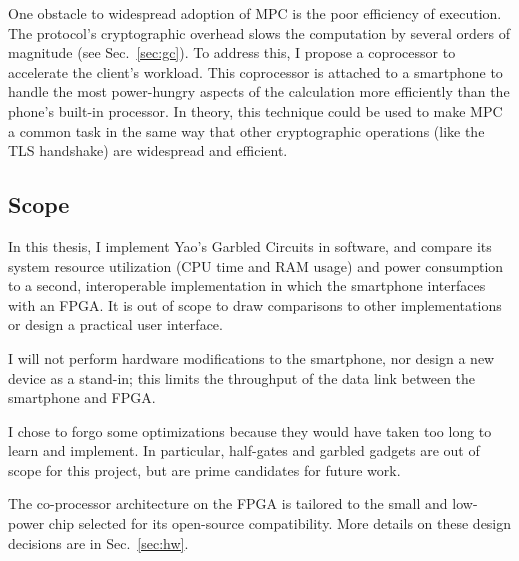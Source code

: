 One obstacle to widespread adoption of MPC is the poor efficiency of execution. The protocol's cryptographic overhead slows the computation by several orders of magnitude (see Sec.~\ref{sec:gc}). To address this, I propose a coprocessor to accelerate the client's workload. This coprocessor is attached to a smartphone to handle the most power-hungry aspects of the calculation more efficiently than the phone's built-in processor. In theory, this technique could be used to make MPC a common task in the same way that other cryptographic operations (like the TLS handshake) are widespread and efficient.

\subsection{Scope}
In this thesis, I implement Yao's Garbled Circuits in software, and compare its system resource utilization (CPU time and RAM usage) and power consumption to a second, interoperable implementation in which the smartphone interfaces with an FPGA\@. It is out of scope to draw comparisons to other implementations or design a practical user interface.

I will not perform hardware modifications to the smartphone, nor design a new device as a stand-in; this limits the throughput of the data link between the smartphone and FPGA.

I chose to forgo some optimizations because they would have taken too long to learn and implement. In particular, half-gates and garbled gadgets are out of scope for this project, but are prime candidates for future work.

The co-processor architecture on the FPGA is tailored to the small and low-power chip selected for its open-source\cite{IceStorm} compatibility. More details on these design decisions are in Sec.~\ref{sec:hw}.
